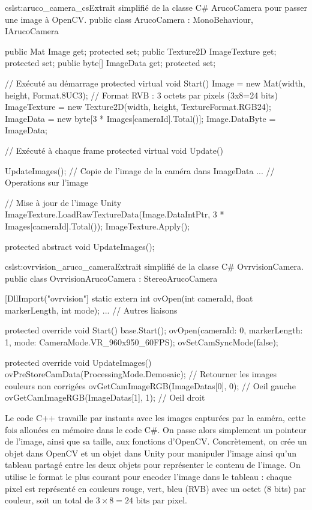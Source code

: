 \begin{listingETS}{cs}{lst:aruco_camera_cs}{Extrait simplifié de la classe C\# ArucoCamera pour passer une image à OpenCV.}
  public class ArucoCamera : MonoBehaviour, IArucoCamera
  {
    public Mat Image { get; protected set; }
    public Texture2D ImageTexture { get; protected set; }
    public byte[] ImageData { get; protected set; }

    // Exécuté au démarrage
    protected virtual void Start()
    {
      Image = new Mat(width, height, Format.8UC3); // Format RVB : 3 octets par pixels (3x8=24 bits)
      ImageTexture = new Texture2D(width, height, TextureFormat.RGB24);
      ImageData = new byte[3 * Images[cameraId].Total()];
      Image.DataByte = ImageData;
    }

    // Exécuté à chaque frame
    protected virtual void Update()
    {
      UpdateImages(); // Copie de l'image de la caméra dans ImageData
      ... // Operations sur l'image

      // Mise à jour de l'image Unity
      ImageTexture.LoadRawTextureData(Image.DataIntPtr, 3 * Images[cameraId].Total());
      ImageTexture.Apply();
    }

    protected abstract void UpdateImages();
  }
\end{listingETS}

\begin{listingETS}{cs}{lst:ovrvision_aruco_camera}{Extrait simplifié de la classe C\# OvrvisionCamera.}
  public class OvrvisionArucoCamera : StereoArucoCamera
  {
    [DllImport("ovrvision"]
    static extern int ovOpen(int cameraId, float markerLength, int mode);
    ... // Autres liaisons

    protected override void Start()
    {
      base.Start();
      ovOpen(cameraId: 0, markerLength: 1, mode: CameraMode.VR_960x950_60FPS);
      ovSetCamSyncMode(false);
    }

    protected override void UpdateImages()
    {
      ovPreStoreCamData(ProcessingMode.Demosaic); // Retourner les images couleurs non corrigées
      ovGetCamImageRGB(ImageDatas[0], 0); // Oeil gauche
      ovGetCamImageRGB(ImageDatas[1], 1); // Oeil droit
    }
  }
\end{listingETS}

Le code C++ travaille par instants avec les images capturées par la caméra, cette fois allouées en mémoire dans le code C\#. On passe alors simplement un pointeur de l'image, ainsi que sa taille, aux fonctions d'OpenCV. Concrètement, on crée un objet  dans OpenCV et un objet  dans Unity pour manipuler l'image ainsi qu'un tableau partagé entre les deux objets pour représenter le contenu de l'image. On utilise le format le plus courant pour encoder l'image dans le tableau : chaque pixel est représenté en couleurs rouge, vert, bleu (RVB) avec un octet (8 bits) par couleur, soit un total de $3 \times 8 = 24\text{ bits}$ par pixel.

